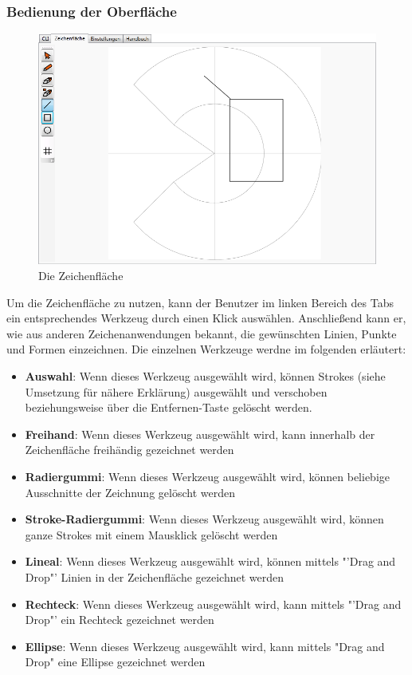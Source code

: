 \subsubsection{Bedienung der Oberfläche}

\begin{figure}[H]
  \centering
  \begin{minipage}[t]{12 cm}
  	\centering
  	\includegraphics[width=12cm]{images/DrawingArea} 
    \caption{Die Zeichenfläche}
  \end{minipage}
\end{figure}

Um die Zeichenfläche zu nutzen, kann der Benutzer im linken Bereich des Tabs ein entsprechendes Werkzeug durch einen Klick auswählen. Anschließend kann er, wie aus anderen Zeichenanwendungen bekannt, die gewünschten Linien, Punkte und Formen einzeichnen. Die einzelnen Werkzeuge werdne im folgenden erläutert:
\begin{itemize}
\item \textbf{Auswahl}: Wenn dieses Werkzeug ausgewählt wird, können Strokes (siehe Umsetzung für nähere Erklärung) ausgewählt und verschoben beziehungsweise über die Entfernen-Taste gelöscht werden.
\item \textbf{Freihand}: Wenn dieses Werkzeug ausgewählt wird, kann innerhalb der Zeichenfläche freihändig gezeichnet werden
\item \textbf{Radiergummi}: Wenn dieses Werkzeug ausgewählt wird, können beliebige Ausschnitte der Zeichnung gelöscht werden
\item \textbf{Stroke-Radiergummi}: Wenn dieses Werkzeug ausgewählt wird, können ganze Strokes mit einem Mausklick gelöscht werden
\item \textbf{Lineal}: Wenn dieses Werkzeug ausgewählt wird, können mittels "'Drag and Drop"' Linien in der Zeichenfläche gezeichnet werden
\item \textbf{Rechteck}: Wenn dieses Werkzeug ausgewählt wird, kann mittels "'Drag and Drop"' ein Rechteck gezeichnet werden
\item \textbf{Ellipse}: Wenn dieses Werkzeug ausgewählt wird, kann mittels "Drag and Drop" eine Ellipse gezeichnet werden
\end{itemize}

